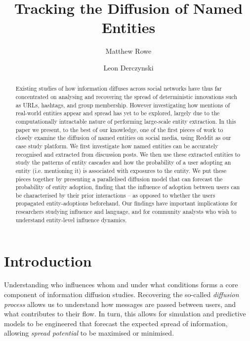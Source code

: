 \documentclass[sigconf]{acmart}
\begin{document}
\title{Tracking the Diffusion of Named Entities}
\author{Matthew Rowe}
\author{Leon Derczynski}


\begin{abstract}
Existing studies of how information diffuses across social networks have thus far concentrated on analysing and recovering the spread of deterministic innovations such as URLs, hashtags, and group membership.
However investigating how mentions of real-world entities appear and spread has yet to be explored, largely due to the computationally intractable nature of performing large-scale entity extraction.
In this paper we present, to the best of our knowledge, one of the first pieces of work to closely examine the diffusion of named entities on social media, using Reddit as our case study platform.
We first investigate how named entities can be accurately recognised and extracted from discussion posts. %
We then use these extracted entities to study the patterns of entity cascades and how the probability of a user adopting an entity (i.e. mentioning it) is associated with exposures to the entity.
We put these pieces together by presenting a parallelised diffusion model that can forecast the probability of entity adoption, finding that the influence of adoption between users can be characterised by their prior interactions -- as opposed to whether the users propagated entity-adoptions beforehand.
Our findings have important implications for researchers studying influence and language, and for community analysts who wish to understand entity-level influence dynamics.
\end{abstract}



\maketitle






\section{Introduction}\label{sec:introduction}
Understanding who influences whom and under what conditions forms a core component of information diffusion studies.
Recovering the so-called \emph{diffusion process} allows us to understand how messages are passed between users, and what contributes to their flow.
In turn, this allows for simulation and predictive models to be engineered that forecast the expected spread of information, allowing \emph{spread potential} to be maximised or minimised.
\end{document}
